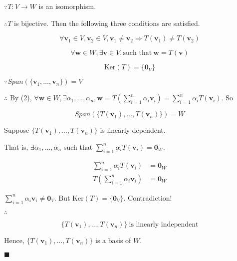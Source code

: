 \documentclass[12pt]{article}
\renewcommand{\qed}{\hfill$\blacksquare$}
\renewenvironment{proof}{\begin{addmargin}[1em]{0em}\begin{newproof}}{\end{newproof}\end{addmargin}\qed}
\begin{document}
\begin{proof}{}
    \noindent

    $\because T:V\rightarrow W$ is an isomorphism.

    $\therefore T$ is bijective. Then the following three conditions are satisfied.

    \begin{equation}
        \forall \mathbf{v}_1\in V,\mathbf{v}_2\in V,\mathbf{v}_1\not=\mathbf{v}_2\Longrightarrow T(\mathbf{v}_1)\not=T(\mathbf{v}_2)
    \end{equation}

    \begin{equation}
        \forall \mathbf{w}\in W,\exists\mathbf{v}\in V,\textrm{such that}\ \mathbf{w}=T(\mathbf{v})
    \end{equation}

    \begin{equation}
        \textrm{Ker}(T)=\{\mathbf{0}_V\}
    \end{equation}

    $\because Span(\{\mathbf{v}_1,\dots,\mathbf{v}_n\})=V$

    $\therefore$ By (2), $\forall\mathbf{w}\in W,\exists\alpha_1,\dots,\alpha_n,\mathbf{w}=T(\sum_{i=1}^{n}\alpha_i\mathbf{v}_i)=\sum_{i=1}^{n}\alpha_iT(\mathbf{v}_i)$. So

    \begin{equation}
        Span(\{T(\mathbf{v}_1),\dots,T(\mathbf{v}_n)\})=W
    \end{equation}

    Suppose $\{T(\mathbf{v}_1),\dots,T(\mathbf{v}_n)\}$ is linearly dependent.

    That is, $\exists\alpha_1,\dots,\alpha_n$ such that $\sum_{i=1}^{n}\alpha_iT(\mathbf{v}_i)=\mathbf{0}_W$.

    \begin{equation}
        \begin{aligned}
            \sum_{i=1}^{n}\alpha_iT(\mathbf{v}_i)&=\mathbf{0}_W\\
            T\left(\sum_{i=1}^{n}\alpha_i\mathbf{v}_i\right)&=\mathbf{0}_W
        \end{aligned}
    \end{equation}

    $\sum_{i=1}^{n}\alpha_i\mathbf{v}_i\not=\mathbf{0}_V$. But $\textrm{Ker}(T)=\{\mathbf{0}_V\}$. Contradiction!

    $\therefore$

    \begin{equation}
        \{T(\mathbf{v}_1),\dots,T(\mathbf{v}_n)\}\ \textrm{is linearly independent}
    \end{equation}

    Hence, $\{T(\mathbf{v}_1),\dots,T(\mathbf{v}_n)\}$ is a basis of $W$.
\end{proof}
\end{document}
